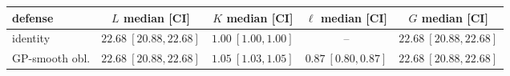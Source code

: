 \footnotesize
\setlength{\tabcolsep}{4pt}
\begin{tabular}{lcccc}
\toprule
defense          & $L$ median [CI]              & $K$ median [CI]        & $\ell$ median [CI]     & $G$ median [CI] \\
\midrule
identity         & $22.68\ [20.88, 22.68]$      & $1.00\ [1.00, 1.00]$   & --                     & $22.68\ [20.88, 22.68]$ \\
GP-smooth obl.   & $22.68\ [20.88, 22.68]$      & $1.05\ [1.03, 1.05]$   & $0.87\ [0.80, 0.87]$   & $22.68\ [20.88, 22.68]$ \\
\bottomrule
\end{tabular}
